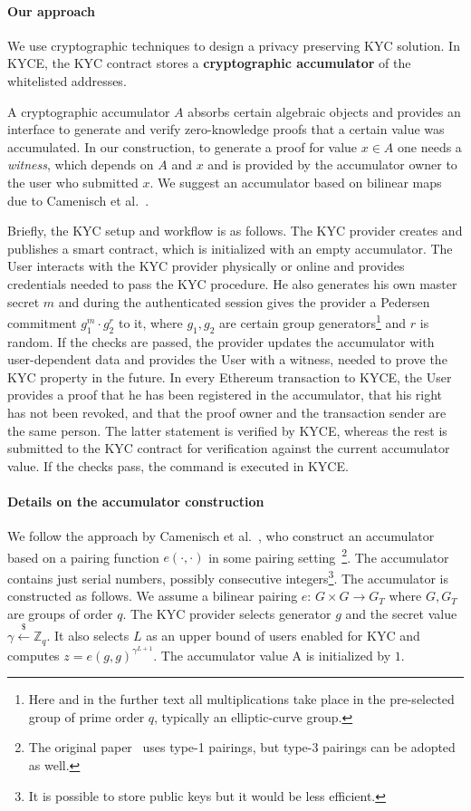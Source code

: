 \paragraph{Our approach}
We use cryptographic techniques to design a privacy preserving KYC solution.
In KYCE, the KYC contract stores a \textbf{cryptographic accumulator} of the whitelisted addresses. 

A cryptographic accumulator $A$ absorbs certain algebraic objects and provides an interface to generate and verify zero-knowledge proofs that a certain value was accumulated.
In our construction, to generate a proof for value $x\in A$ one needs a \emph{witness}, which depends on $A$ and $x$ and is provided by the accumulator owner to the user who submitted $x$.
We suggest an accumulator based on bilinear maps due to Camenisch et al.~\cite{Camenisch2009}.

Briefly, the KYC setup and workflow is as follows.
The KYC provider creates and publishes a smart contract, which is initialized with an empty accumulator.
The User interacts with the KYC provider physically or online and provides credentials needed to pass the KYC procedure.
He also generates his own master secret $m$ and during the authenticated session gives the provider a Pedersen commitment $g_1^m\cdot g_2^r$ to it, where $g_1,g_2$ are certain group generators\footnote{Here and in the further text all
	multiplications take place in the pre-selected group of prime order $q$, typically an elliptic-curve group.} and $r$ is random.
If the checks are passed, the provider updates the accumulator with user-dependent data and provides the User with a witness, needed to prove the KYC property in the future.
In every Ethereum transaction to KYCE, the User provides a proof that he has been registered in the accumulator, that his right has not been revoked, and that the proof owner and the transaction sender are the same person.
The latter statement is verified by KYCE, whereas the rest is submitted to the KYC contract for verification against the current accumulator value.
If the checks pass, the command is executed in KYCE.

\paragraph{Details on the accumulator construction} We follow the approach by Camenisch et al.~\cite{Camenisch2009}, who construct an accumulator based on a pairing function $e(\cdot,\cdot)$ in some pairing setting~\footnote{The original paper~\cite{Camenisch2009} uses type-1 pairings, but type-3 pairings can be adopted as well.}.
The accumulator contains just serial numbers, possibly consecutive integers\footnote{It is possible to store public keys but it would be less efficient.}.
The accumulator is constructed as follows.
We assume a bilinear pairing $e:\,G\times G\rightarrow G_T$ where 
$G,G_T$ are groups of order $q$. The KYC provider selects generator $g$ and the secret value  
$\gamma\overset{\$}{\leftarrow} \mathbb{Z}_q$. It also selects $L$ as an upper bound of users enabled for KYC  and computes $z = e(g,g)^{\gamma^{L+1}}$. The accumulator value
$\mathrm{A}$ is initialized by $1$. 

